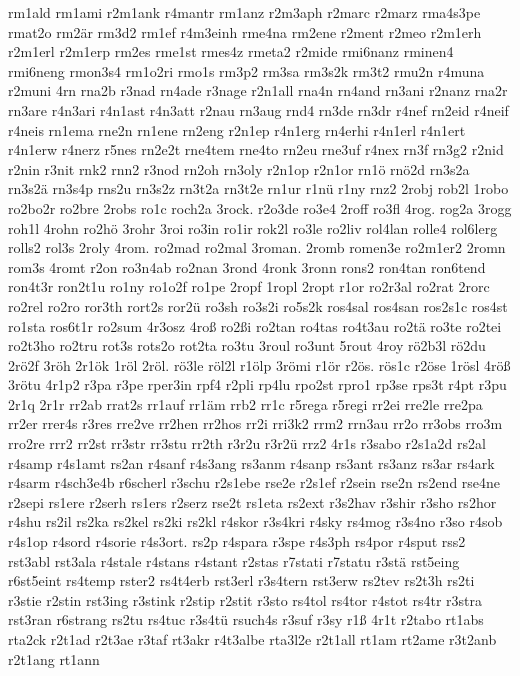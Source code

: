 {rm1ald
rm1ami
r2m1ank
r4mantr
rm1anz
r2m3aph
r2marc
r2marz
rma4s3pe
rmat2o
rm2är
rm3d2
rm1ef
r4m3einh
rme4na
rm2ene
r2ment
r2meo
r2m1erh
r2m1erl
r2m1erp
rm2es
rme1st
rmes4z
rmeta2
r2mide
rmi6nanz
rminen4
rmi6neng
rmon3s4
rm1o2ri
rmo1s
rm3p2
rm3sa
rm3s2k
rm3t2
rmu2n
r4muna
r2muni
4rn
rna2b
r3nad
rn4ade
r3nage
r2n1all
rna4n
rn4and
rn3ani
r2nanz
rna2r
rn3are
r4n3ari
r4n1ast
r4n3att
r2nau
rn3aug
rnd4
rn3de
rn3dr
r4nef
rn2eid
r4neif
r4neis
rn1ema
rne2n
rn1ene
rn2eng
r2n1ep
r4n1erg
rn4erhi
r4n1erl
r4n1ert
r4n1erw
r4nerz
r5nes
rn2e2t
rne4tem
rne4to
rn2eu
rne3uf
r4nex
rn3f
rn3g2
r2nid
r2nin
r3nit
rnk2
rnn2
r3nod
rn2oh
rn3oly
r2n1op
r2n1or
rn1ö
rnö2d
rn3s2a
rn3s2ä
rn3s4p
rns2u
rn3s2z
rn3t2a
rn3t2e
rn1ur
r1nü
r1ny
rnz2
2robj
rob2l
1robo
ro2bo2r
ro2bre
2robs
ro1c
roch2a
3rock.
r2o3de
ro3e4
2roff
ro3fl
4rog.
rog2a
3rogg
roh1l
4rohn
ro2hö
3rohr
3roi
ro3in
ro1ir
rok2l
ro3le
ro2liv
rol4lan
rolle4
rol6lerg
rolls2
rol3s
2roly
4rom.
ro2mad
ro2mal
3roman.
2romb
romen3e
ro2m1er2
2romn
rom3s
4romt
r2on
ro3n4ab
ro2nan
3rond
4ronk
3ronn
rons2
ron4tan
ron6tend
ron4t3r
ron2t1u
ro1ny
ro1o2f
ro1pe
2ropf
1ropl
2ropt
r1or
ro2r3al
ro2rat
2rorc
ro2rel
ro2ro
ror3th
rort2s
ror2ü
ro3sh
ro3s2i
ro5s2k
ros4sal
ros4san
ros2s1c
ros4st
ro1sta
ros6t1r
ro2sum
4r3osz
4roß
ro2ßi
ro2tan
ro4tas
ro4t3au
ro2tä
ro3te
ro2tei
ro2t3ho
ro2tru
rot3s
rots2o
rot2ta
ro3tu
3roul
ro3unt
5rout
4roy
rö2b3l
rö2du
2rö2f
3röh
2r1ök
1röl
2röl.
rö3le
röl2l
r1ölp
3römi
r1ör
r2ös.
rös1c
r2öse
1rösl
4röß
3rötu
4r1p2
r3pa
r3pe
rper3in
rpf4
r2pli
rp4lu
rpo2st
rpro1
rp3se
rps3t
r4pt
r3pu
2r1q
2r1r
rr2ab
rrat2s
rr1auf
rr1äm
rrb2
rr1c
r5rega
r5regi
rr2ei
rre2le
rre2pa
rr2er
rrer4s
r3res
rre2ve
rr2hen
rr2hos
rr2i
rri3k2
rrm2
rrn3au
rr2o
rr3obs
rro3m
rro2re
rrr2
rr2st
rr3str
rr3stu
rr2th
r3r2u
r3r2ü
rrz2
4r1s
r3sabo
r2s1a2d
rs2al
r4samp
r4s1amt
rs2an
r4sanf
r4s3ang
rs3anm
r4sanp
rs3ant
rs3anz
rs3ar
rs4ark
r4sarm
r4sch3e4b
r6scherl
r3schu
r2s1ebe
rse2e
r2s1ef
r2sein
rse2n
rs2end
rse4ne
r2sepi
rs1ere
r2serh
rs1ers
r2serz
rse2t
rs1eta
rs2ext
r3s2hav
r3shir
r3sho
rs2hor
r4shu
rs2il
rs2ka
rs2kel
rs2ki
rs2kl
r4skor
r3s4kri
r4sky
rs4mog
r3s4no
r3so
r4sob
r4s1op
r4sord
r4sorie
r4s3ort.
rs2p
r4spara
r3spe
r4s3ph
rs4por
r4sput
rss2
rst3abl
rst3ala
r4stale
r4stans
r4stant
r2stas
r7stati
r7statu
r3stä
rst5eing
r6st5eint
rs4temp
rster2
rs4t4erb
rst3erl
r3s4tern
rst3erw
rs2tev
rs2t3h
rs2ti
r3stie
r2stin
rst3ing
r3stink
r2stip
r2stit
r3sto
rs4tol
rs4tor
r4stot
rs4tr
r3stra
rst3ran
r6strang
rs2tu
rs4tuc
r3s4tü
rsuch4s
r3suf
r3sy
r1ß
4r1t
r2tabo
rt1abs
rta2ck
r2t1ad
r2t3ae
r3taf
rt3akr
r4t3albe
rta3l2e
r2t1all
rt1am
rt2ame
r3t2anb
r2t1ang
rt1ann
}
